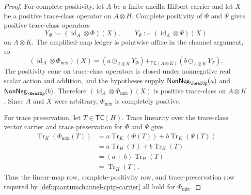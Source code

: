 \begin{proof}
For complete positivity, let $A$ be a finite ancilla Hilbert carrier and let $X$ be a positive trace-class operator on $A\otimes H$. Complete positivity of $\Phi$ and $\Psi$ gives positive trace-class operators
$$
Y_{\Phi}:=(\operatorname{id}_A\otimes\Phi)(X),
\qquad
Y_{\Psi}:=(\operatorname{id}_A\otimes\Psi)(X)
$$
on $A\otimes K$. The amplified-map ledger is pointwise affine in the channel argument, so
$$
(\operatorname{id}_A\otimes\Phi_{\mathrm{mix}})(X)
=
(a\odot_{A\otimes K}Y_{\Phi})+_{\mathsf{TC}(A\otimes K)}(b\odot_{A\otimes K}Y_{\Psi}).
$$
The positivity cone on trace-class operators is closed under nonnegative real scalar action and addition, and the hypotheses supply $\mathsf{NonNeg}_{\RealUp}(a)$ and $\mathsf{NonNeg}_{\RealUp}(b)$. Therefore $(\operatorname{id}_A\otimes\Phi_{\mathrm{mix}})(X)$ is positive trace-class on $A\otimes K$. Since $A$ and $X$ were arbitrary, $\Phi_{\mathrm{mix}}$ is completely positive.

For trace preservation, let $T\in\mathsf{TC}(H)$. Trace linearity over the trace-class vector carrier and trace preservation for $\Phi$ and $\Psi$ give
$$
\begin{aligned}
\operatorname{Tr}_K(\Phi_{\mathrm{mix}}(T))
&=
 a\operatorname{Tr}_K(\Phi(T))+b\operatorname{Tr}_K(\Psi(T))\\
&=
 a\operatorname{Tr}_H(T)+b\operatorname{Tr}_H(T)\\
&=
 (a+b)\operatorname{Tr}_H(T)\\
&=
 \operatorname{Tr}_H(T).
\end{aligned}
$$
Thus the linear-map row, complete-positivity row, and trace-preservation row required by \autoref{def:quantumchannel-cptp-carrier} all hold for $\Phi_{\mathrm{mix}}$.
\end{proof}

